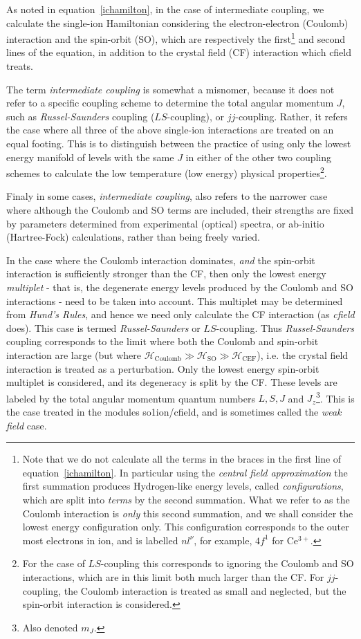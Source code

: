 As noted in equation~\ref{ichamilton}, in the case of intermediate coupling, we calculate
the single-ion Hamiltonian considering the electron-electron (Coulomb) interaction and the
spin-orbit (SO), which are respectively the first\footnote{Note that we do not calculate all the
terms in the braces in the first line of equation~\ref{ichamilton}. In particular using the
\emph{central field approximation} the first summation produces Hydrogen-like energy levels, called
\emph{configurations}, which are split into \emph{terms} by the second summation. What we refer to
as the Coulomb interaction is \emph{only} this second summation, and we shall consider the lowest
energy configuration only. This configuration corresponds to the outer most electrons in ion, and is
labelled $nl^\nu$, for example, $4f^1$ for Ce$^{3+}$.} and second lines of the equation, in addition
to the crystal field (CF) interaction which {\prg cfield} treats. 

The term \emph{intermediate coupling} is somewhat a misnomer, because it does not refer to a
specific coupling scheme to determine the total angular momentum $J$, such as
\emph{Russel-Saunders} coupling ($LS$-coupling), or $jj$-coupling. Rather, it refers the case where all
three of the above single-ion interactions are treated on an equal footing. This is to distinguish
between the practice of using only the lowest energy manifold of levels with the same $J$ in either
of the other two coupling schemes to calculate the low temperature (low energy) physical
properties\footnote{For the case of $LS$-coupling this corresponds to ignoring the Coulomb and SO
interactions, which are in this limit both much larger than the CF. For $jj$-coupling, the Coulomb
interaction is treated as small and neglected, but the spin-orbit interaction is considered.}.

Finaly in some cases, \emph{intermediate coupling}, also refers to the narrower case where although
the Coulomb and SO terms are included, their strengths are fixed by parameters determined from
experimental (optical) spectra, or ab-initio (Hartree-Fock) calculations, rather than being freely
varied.  

In the case where the Coulomb interaction dominates, \emph{and} the
spin-orbit interaction is sufficiently stronger than the CF, then only the lowest
energy \emph{multiplet} - that is, the degenerate energy levels produced by the Coulomb and SO
interactions - need to be taken into account. This multiplet may be determined from \emph{Hund's
Rules}, and hence we need only calculate the CF interaction (as \emph{cfield} does). This case is
termed \emph{Russel-Saunders} or $LS$-coupling. 
Thus  \emph{Russel-Saunders} coupling corresponds to the limit where
both the Coulomb and spin-orbit interaction are large (but where $\mathcal{H}_{\mathrm{Coulomb}}\gg
\mathcal{H}_{\mathrm{SO}}\gg
\mathcal{H}_{\mathrm{CEF}}$), i.e. the crystal field interaction is treated as a perturbation. Only
the lowest energy spin-orbit multiplet is considered, and its degeneracy is split by the CF. These
levels are labeled by the total angular momentum quantum numbers $L, S, J$ and $J_z$\footnote{Also
denoted $m_J$.}. This is the case treated in the modules {\prg so1ion}/{\prg cfield}, and is 
sometimes called the \emph{weak field} case.

